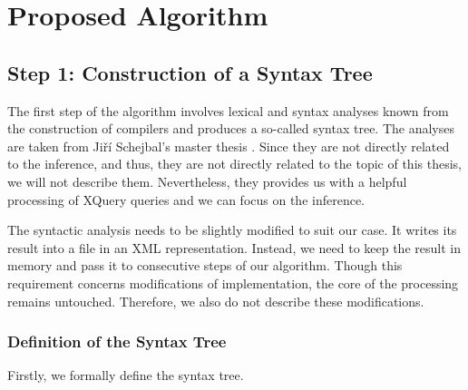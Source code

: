 \chapter{Proposed Algorithm}

\section{Step 1: Construction of a Syntax Tree}
The first step of the algorithm involves lexical and syntax analyses known from the construction of compilers and produces a so-called syntax tree. The analyses are taken from Ji\v r\'{i} Schejbal's master thesis . Since they are not directly related to the inference, and thus, they are not directly related to the topic of this thesis, we will not describe them. Nevertheless, they provides us with a helpful processing of XQuery queries and we can focus on the inference.

The syntactic analysis needs to be slightly modified to suit our case. It writes its result into a file in an XML representation. Instead, we need to keep the result in memory and pass it to consecutive steps of our algorithm. Though this requirement concerns modifications of implementation, the core of the processing remains untouched. Therefore, we also do not describe these modifications.

\subsection{Definition of the Syntax Tree}
Firstly, we formally define the syntax tree.

